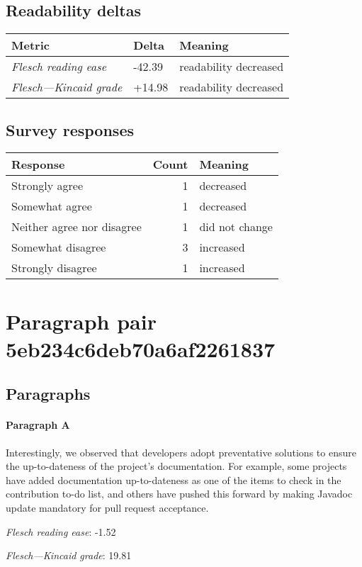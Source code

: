 \subsection{Readability deltas}

\begin{tabular}{lll}
\toprule
               \textbf{Metric} & \textbf{Delta} &       \textbf{Meaning} \\
\midrule
    \emph{Flesch reading ease} &         -42.39 &  readability decreased \\
 \emph{Flesch---Kincaid grade} &         +14.98 &  readability decreased \\
\bottomrule
\end{tabular}

\subsection{Survey responses}
\begin{tabular}{lrl}
\toprule
          \textbf{Response} &  \textbf{Count} & \textbf{Meaning} \\
\midrule
             Strongly agree &               1 &        decreased \\
             Somewhat agree &               1 &        decreased \\
 Neither agree nor disagree &               1 &   did not change \\
          Somewhat disagree &               3 &        increased \\
          Strongly disagree &               1 &        increased \\
\bottomrule
\end{tabular}

\section{Paragraph pair 5eb234c6deb70a6af2261837}
\subsection{Paragraphs}
\paragraph{Paragraph A}
Interestingly, we observed that developers adopt preventative solutions to ensure the up-to-dateness of the project's documentation. For example, some projects have added documentation up-to-dateness as one of the items to check in the contribution to-do list, and others have pushed this forward by making Javadoc update mandatory for pull request acceptance.\par\medskip
\emph{Flesch reading ease}: -1.52\par
\emph{Flesch---Kincaid grade}: 19.81

